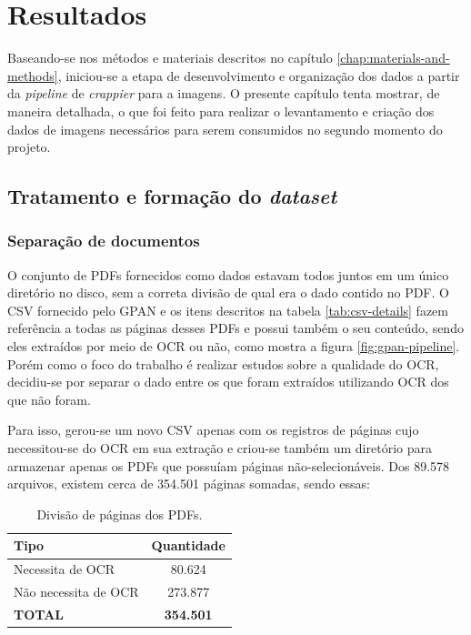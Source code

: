 \chapter[Resultados]{Resultados}

Baseando-se nos métodos e materiais descritos no capítulo \ref{chap:materials-and-methods}, iniciou-se a etapa de desenvolvimento e organização dos dados a partir da \textit{pipeline} de \textit{crappier} para a imagens. O presente capítulo tenta mostrar, de maneira detalhada, o que foi feito para realizar o levantamento e criação dos dados de imagens necessários para serem consumidos no segundo momento do projeto.

\section{Tratamento e formação do \textit{dataset}}

\subsection{Separação de documentos}
O conjunto de PDFs fornecidos como dados estavam todos juntos em um único diretório no disco, sem a correta divisão de qual era o dado contido no PDF. O CSV fornecido pelo GPAN e os itens descritos na tabela \ref{tab:csv-details} fazem referência a todas as páginas desses PDFs e possui também o seu conteúdo, sendo eles extraídos por meio de OCR ou não, como mostra a figura \ref{fig:gpan-pipeline}. Porém como o foco do trabalho é realizar estudos sobre a qualidade do OCR, decidiu-se por separar o dado entre os que foram extraídos utilizando OCR dos que não foram.

Para isso, gerou-se um novo CSV apenas com os registros de páginas cujo necessitou-se do OCR em sua extração e criou-se também um diretório para armazenar apenas os PDFs que possuíam páginas não-selecionáveis. Dos 89.578 arquivos, existem cerca de 354.501 páginas somadas, sendo essas:

\begin{table}[H]
  \centering
  \caption{Divisão de páginas dos PDFs.}
  \begin{tabular}{|m{10em}|c|}
    \hline
      \textbf{Tipo}  &
      \textbf{Quantidade} \\
    \hline
      Necessita de OCR  &
      80.624 \\
    \hline
      Não necessita de OCR  &
      273.877 \\
    \hline
      \textbf{TOTAL}  &
      \textbf{354.501} \\
    \hline
  \end{tabular}
  \label{tab:csv-diff}
\end{table}

